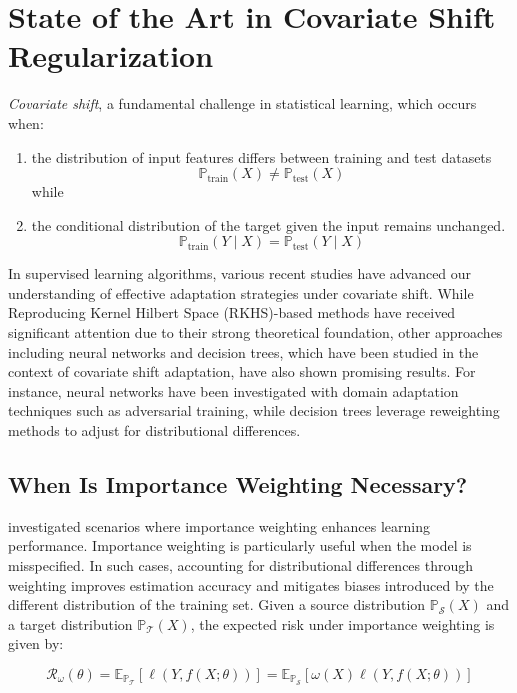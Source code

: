\chapter{State of the Art in Covariate Shift Regularization}\label{chp:5}

\emph{Covariate shift}, a fundamental challenge in statistical learning, which occurs when:
\begin{enumerate}
    \item the distribution of input features differs between training and test datasets
    $$\mathbb{P}_{\text{train}}(X) \neq \mathbb{P}_{\text{test}}(X)$$
    while
    \item the conditional distribution of the target given the input remains unchanged.
    $$\mathbb{P}_{\text{train}}(Y \mid X) = \mathbb{P}_{\text{test}}(Y \mid X)$$
\end{enumerate}

In supervised learning algorithms, various recent studies have advanced our understanding of effective adaptation strategies under covariate shift. While Reproducing Kernel Hilbert Space (RKHS)-based methods have received significant attention due to their strong theoretical foundation, other approaches including neural networks and decision trees, which have been studied in the context of covariate shift adaptation, have also shown promising results. For instance, neural networks have been investigated with domain adaptation techniques such as adversarial training, while decision trees leverage reweighting methods to adjust for distributional differences.\\

\section{When Is Importance Weighting Necessary?}

\citep{gogolashvili2023importance} investigated scenarios where importance weighting enhances learning performance. Importance weighting is particularly useful when the model is misspecified. In such cases, accounting for distributional differences through weighting improves estimation accuracy and mitigates biases introduced by the different distribution of the training set. Given a source distribution $\mathbb{P}_{\mathcal{S}}(X)$ and a target distribution $\mathbb{P}_{\mathcal{T}}(X)$, the expected risk under importance weighting \citep{sugiyama2000covariate} is given by:

\begin{equation}
    \mathcal{R}_{\omega}(\theta) = \mathbb{E}_{\mathbb{P}_{\mathcal{T}}}[\ell (Y, f(X; \theta))] = \mathbb{E}_{\mathbb{P}_{\mathcal{S}}}[\omega(X) \ell (Y, f(X; \theta))]
    \label{eqn:5.1}
\end{equation}

